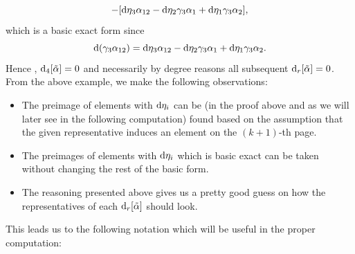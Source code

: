 \documentclass[10pt,a4paper]{amsart}
\numberwithin{equation}{section}
\theoremstyle{definition}
\begin{document}
\[-[{\rm d}\eta_3\alpha_{12}-{\rm d}\eta_2\gamma_3\alpha_1+{\rm d}\eta_1\gamma_3\alpha_2],\]
which is a basic exact form since
\[{\rm d}(\gamma_3\alpha_{12})={\rm d}\eta_3\alpha_{12}-{\rm d}\eta_2\gamma_3\alpha_1+{\rm d}\eta_1\gamma_3\alpha_2.\]
Hence , ${\rm d}_4[\tilde{\alpha}]=0$ and necessarily by degree reasons all subsequent ${\rm d}_r[\tilde{\alpha}]=0$. From the above example, we make the following observations:
\begin{itemize}\itemsep=0pt
\item The preimage of elements with ${\rm d}\eta_i$ can be (in the proof above and as we will later see in the following computation) found based on the assumption that the given representative induces an element on the $(k+1)$-th page.
\item The preimages of elements with ${\rm d}\eta_i$ which is basic exact can be taken without changing the rest of the basic form.
\item The reasoning presented above gives us a pretty good guess on how the representatives of each ${\rm d}_r[\tilde{\alpha}]$ should look.
\end{itemize}
This leads us to the following notation which will be useful in the proper computation:
\end{document}

